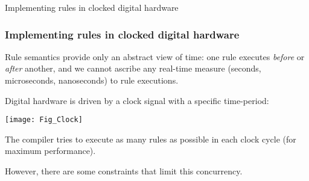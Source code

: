 \begin{frame}

\begin{center}
  {\LARGE Implementing rules in clocked digital hardware}
\end{center}

\end{frame}


\begin{frame}[fragile]
\frametitle{Implementing rules in clocked digital hardware}

\footnotesize

Rule semantics provide only an abstract view of time: one rule
executes \emph{before} or \emph{after} another, and we cannot ascribe
any real-time measure (seconds, microseconds, nanoseconds) to rule
executions.

\vspace{5ex}

Digital hardware is driven by a clock signal with a specific time-period:

\begin{center}
 \texttt{[image: Fig\_Clock]}
\end{center}

\vspace{2ex}

The {\bsc} compiler tries to execute as many rules as possible in each
clock cycle (for maximum performance).

\vspace{2ex}

However, there are some constraints that limit this concurrency.

\end{frame}



